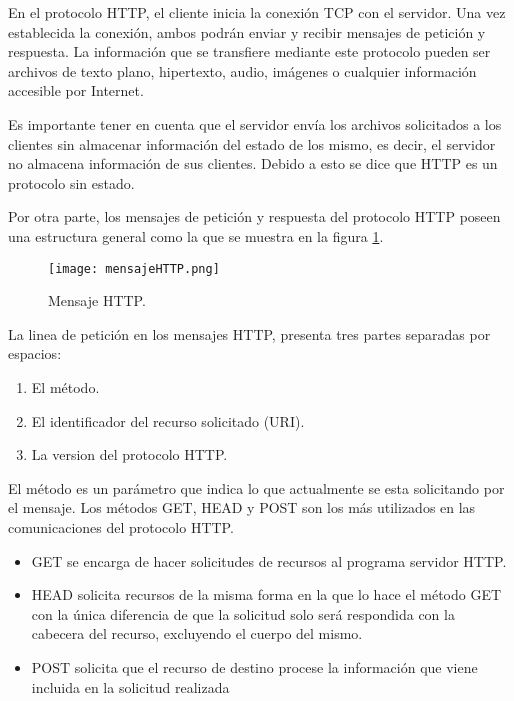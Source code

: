 En el protocolo HTTP, el cliente inicia la conexión TCP con el servidor. Una vez establecida la conexión, ambos podrán enviar y recibir mensajes de petición y respuesta. La información que se transfiere mediante este protocolo pueden ser archivos de texto plano, hipertexto, audio, imágenes o cualquier información accesible por Internet.

Es importante tener en cuenta que el servidor envía los archivos solicitados a los clientes sin almacenar información del estado de los mismo, es decir, el servidor no almacena información de sus clientes. Debido a esto se dice que HTTP es un protocolo sin estado.\cite{httpKross}

Por otra parte, los mensajes de petición y respuesta del protocolo HTTP poseen una estructura general como la que se muestra en la figura \ref{fig:httpMensaje}.

\begin{figure}[tb]
\begin{center}
\texttt{[image: mensajeHTTP.png]}
\caption{Mensaje HTTP.\cite{httpKross}}
\label{fig:httpMensaje}
\end{center}
\end{figure}

La linea de petición en los mensajes HTTP, presenta tres partes separadas por espacios:

\begin{enumerate}
\item El método.
\item El identificador del recurso solicitado (URI).
\item La version del protocolo HTTP.
\end{enumerate}

El método es un parámetro que indica lo que actualmente se esta solicitando por el mensaje. 
Los m\'etodos GET, HEAD y POST son los más utilizados en las comunicaciones del protocolo HTTP. 

\begin{itemize}
\item GET se encarga de hacer solicitudes de recursos al programa servidor HTTP.
\item HEAD solicita recursos de la misma forma en la que lo hace el método GET con la \'unica diferencia de que la solicitud solo ser\'a respondida con la cabecera del recurso, excluyendo el cuerpo del mismo.
\item POST solicita que el recurso de destino  procese la informaci\'on que viene incluida en la solicitud realizada
\end{itemize}

